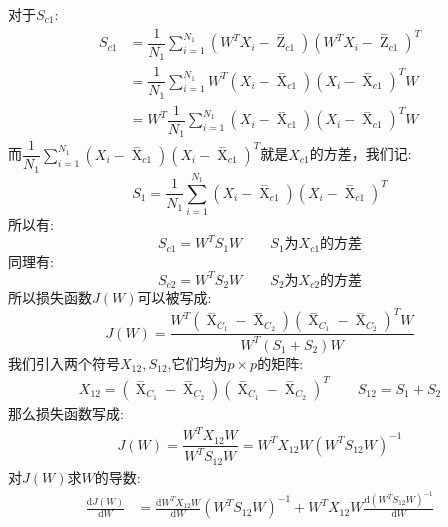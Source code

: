 \documentclass[withoutpreface,bwprint]{cumcmthesis} %
\begin{document}
	对于$S_{c1}$:
	\begin{align*}
		S_{c1}&=\dfrac{1}{N_1}\sum_{i=1}^{N_1}\left( W^TX_i-{\mathop{Z} \limits^{-}}_{c1}\right) \left( W^TX_i-{\mathop{Z} \limits^{-}}_{c1}\right)^T\\
		&=\dfrac{1}{N_1}\sum_{i=1}^{N_1} W^T \left( X_i-{\mathop{X} \limits^{-}}_{c1}\right) \left( X_i-{\mathop{X} \limits^{-}}_{c1}\right)^TW \\
		&=W^T \dfrac{1}{N_1}\sum_{i=1}^{N_1} \left( X_i-{\mathop{X} \limits^{-}}_{c1}\right) \left( X_i-{\mathop{X} \limits^{-}}_{c1}\right)^T W
	\end{align*}
	而$ \dfrac{1}{N_1}\sum_{i=1}^{N_1} \left( X_i-{\mathop{X} \limits^{-}}_{c1}\right) \left( X_i-{\mathop{X} \limits^{-}}_{c1}\right)^T$就是$X_{c1}$的方差，我们记:
	\begin{equation}
		S_1=\dfrac{1}{N_1}\sum_{i=1}^{N_1} \left( X_i-{\mathop{X} \limits^{-}}_{c1}\right) \left( X_i-{\mathop{X} \limits^{-}}_{c1}\right)^T
	\end{equation}
	所以有:
	\begin{equation}
		S_{c1}=W^T S_1 W  \quad\quad \textbf{$S_1$为$X_{c1}$的方差}
	\end{equation}
	同理有:
	\begin{equation}
		S_{c2}=W^T S_2 W  \quad\quad \textbf{$S_2$为$X_{c2}$的方差}
	\end{equation}
	所以损失函数$J(W)$可以被写成:
	\begin{equation}
		J(W)=\dfrac{W^T\left({\mathop{X}\limits^{-}}_{C_1}-{\mathop{X}\limits^{-}}_{C_2} \right)\left({\mathop{X}\limits^{-}}_{C_1}-{\mathop{X}\limits^{-}}_{C_2} \right)^TW}{W^T\left( S_1+S_2 \right)W}
	\end{equation}
	我们引入两个符号$X_{12},S_{12}$,它们均为$p\times p$的矩阵:
	\begin{align*}
		X_{12}=\left({\mathop{X}\limits^{-}}_{C_1}-{\mathop{X}\limits^{-}}_{C_2} \right)\left({\mathop{X}\limits^{-}}_{C_1}-{\mathop{X}\limits^{-}}_{C_2} \right)^T \quad \quad S_{12}=S_1+S_2 
	\end{align*}
	那么损失函数写成:
	\begin{align*}
		J(W)=\dfrac{W^TX_{12}W}{W^TS_{12}W} = W^TX_{12}W\left(W^TS_{12}W\right)^{-1}
	\end{align*}
	对$J(W)$求$W$的导数:
	\begin{align}
		\frac{\mathrm{d} J(W)}{\mathrm{d} W} &=\frac{\mathrm{d} W^TX_{12}W}{\mathrm{d} W} \left(W^TS_{12}W\right)^{-1}+ W^TX_{12}W \frac{\mathrm{d} \left(W^TS_{12}W\right)^{-1}}{\mathrm{d} W} 
	\end{align}
\end{document}
